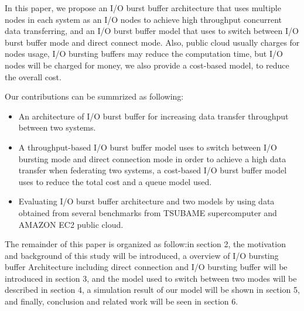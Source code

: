 In this paper, we propose an I/O burst buffer architecture that uses multiple nodes in each system as an I/O nodes 
to achieve high throughput concurrent data transferring, and an I/O burst buffer model 
that uses to switch between I/O burst buffer mode and direct connect mode.
Also, public cloud usually charges for nodes usage, I/O bursting buffers may reduce the computation time, 
but I/O nodes will be charged for money, we also provide a cost-based model, to reduce the overall cost.

Our contributions can be summrized as following:
\begin{itemize}
	\item An architecture of I/O burst buffer for increasing data transfer throughput between two systems.
	\item A throughput-based I/O burst buffer model uses to switch between I/O bursting mode and direct connection mode in order to achieve a high data transfer when federating two systems, a cost-based I/O burst buffer model uses to reduce the total cost and a queue model used.
	\item Evaluating I/O burst buffer architecture and two models by using data obtained from several benchmarks from TSUBAME supercomputer and AMAZON EC2 public cloud.
\end{itemize}
The remainder of this paper is organized as follow:in section 2, the motivation and background of this study will be introduced, a overview of I/O bursting buffer Architecture including direct connection and I/O bursting buffer will be introduced in section 3, and the model used to switch between two modes will be described in section 4, a simulation result of our model %
will be shown in section 5, and finally, conclusion and related work will be seen in section 6.
